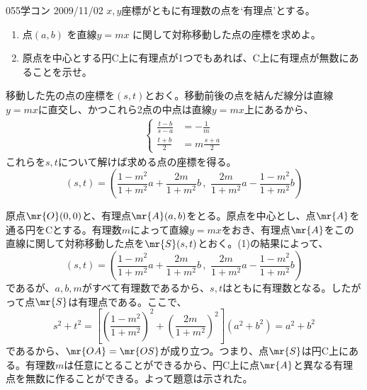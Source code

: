 \begin{thm}{055}{}{学コン 2009/11/02}
 $x,y$座標がともに有理数の点を`有理点'とする。
 \begin{enumerate}
  \item 点$(a,b)$ を直線$y=mx$ に関して対称移動した点の座標を求めよ。
  \item 原点を中心とする円C上に有理点が1つでもあれば、C上に有理点が無数にあることを示せ。
 \end{enumerate}
\end{thm}

移動した先の点の座標を$(s, t)$とおく。移動前後の点を結んだ線分は直線$y=mx$に直交し、かつこれら2点の中点は直線$y=mx$上にあるから、
\begin{align*}
 \left\{
 \begin{aligned}
  \frac{t-b}{s-a}&=-\frac{1}{m} \\
  \frac{t+b}{2}&=m\frac{s+a}{2}
 \end{aligned}\right.
\end{align*}
これらを$s, t$について解けば求める点の座標を得る。
\[ (s, t) = \left( \frac{1-m^2}{1+m^2}a+\frac{2m}{1+m^2}b \,,\,\, \frac{2m}{1+m^2}a-\frac{1-m^2}{1+m^2}b \right) \]

原点$\mr{O}(0,0)$と、有理点$\mr{A}(a, b)$をとる。原点を中心とし、点$\mr{A}$を通る円をCとする。有理数$m$によって直線$y=mx$をおき、有理点$\mr{A}$をこの直線に関して対称移動した点を$\mr{S}(s, t)$とおく。(1)の結果によって、
\[ (s, t) = \left( \frac{1-m^2}{1+m^2}a+\frac{2m}{1+m^2}b \,,\,\, \frac{2m}{1+m^2}a-\frac{1-m^2}{1+m^2}b \right) \]
であるが、$a, b, m$がすべて有理数であるから、$s, t$はともに有理数となる。したがって点$\mr{S}$は有理点である。ここで、
\[ s^2+t^2=\left[\left(\frac{1-m^2}{1+m^2}\right)^2+\left(\frac{2m}{1+m^2}\right)^2\right](a^2+b^2)=a^2+b^2 \]
であるから、$\mr{OA}=\mr{OS}$が成り立つ。つまり、点$\mr{S}$は円C上にある。有理数$m$は任意にとることができるから、円C上に点$\mr{A}$と異なる有理点を無数に作ることができる。よって題意は示された。